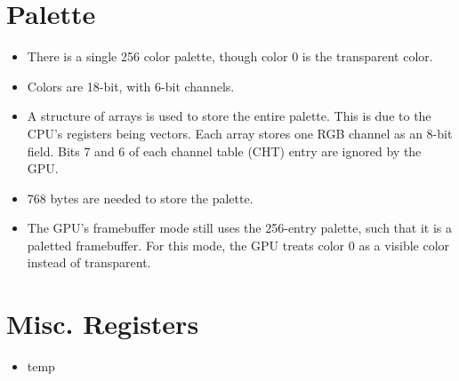 \documentclass{article}
\begin{document}
\section{Palette}
	\begin{itemize}
	\item There is a single 256 color palette, though color 0 is the
	transparent color.

	\item Colors are 18-bit, with 6-bit channels.

	\item A structure of arrays is used to store the entire palette.  This
	is due to the CPU's registers being vectors. Each array stores one RGB
	channel as an 8-bit field.  Bits 7 and 6 of each channel table (CHT)
	entry are ignored by the GPU.

	\item 768 bytes are needed to store the palette. 

	\item The GPU's framebuffer mode still uses the 256-entry palette, such
	that it is a paletted framebuffer.  For this mode, the GPU treats color
	0 as a visible color instead of transparent.
	\end{itemize}
	\newpage

\section{Misc. Registers}
	\begin{itemize}
	\item temp
	\end{itemize}
	\newpage
\end{document}
